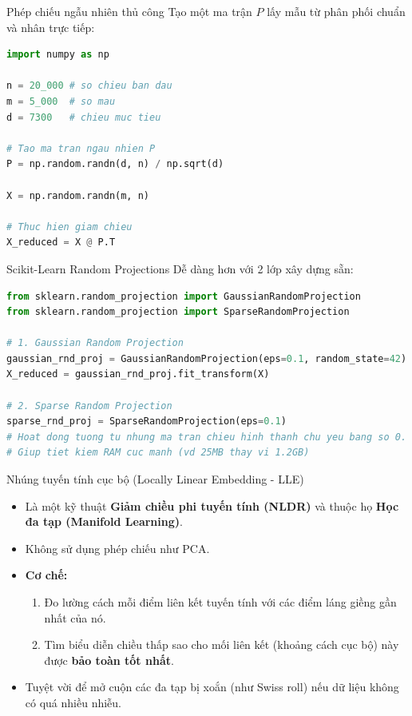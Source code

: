 \documentclass[aspectratio=169]{beamer}
\begin{document}
\begin{frame}[fragile]{Phép chiếu ngẫu nhiên thủ công}
    Tạo một ma trận $P$ lấy mẫu từ phân phối chuẩn và nhân trực tiếp:
    \begin{lstlisting}[language=Python]
import numpy as np

n = 20_000 # so chieu ban dau
m = 5_000  # so mau
d = 7300   # chieu muc tieu

# Tao ma tran ngau nhien P
P = np.random.randn(d, n) / np.sqrt(d)

X = np.random.randn(m, n) 

# Thuc hien giam chieu
X_reduced = X @ P.T 
    \end{lstlisting}
\end{frame}

\begin{frame}[fragile]{Scikit-Learn Random Projections}
    Dễ dàng hơn với 2 lớp xây dựng sẵn:
    \begin{lstlisting}[language=Python]
from sklearn.random_projection import GaussianRandomProjection
from sklearn.random_projection import SparseRandomProjection

# 1. Gaussian Random Projection
gaussian_rnd_proj = GaussianRandomProjection(eps=0.1, random_state=42)
X_reduced = gaussian_rnd_proj.fit_transform(X)

# 2. Sparse Random Projection
sparse_rnd_proj = SparseRandomProjection(eps=0.1)
# Hoat dong tuong tu nhung ma tran chieu hinh thanh chu yeu bang so 0.
# Giup tiet kiem RAM cuc manh (vd 25MB thay vi 1.2GB)
    \end{lstlisting}
\end{frame}

\begin{frame}{Nhúng tuyến tính cục bộ (Locally Linear Embedding - LLE)}
    \begin{itemize}
        \item Là một kỹ thuật \textbf{Giảm chiều phi tuyến tính (NLDR)} và thuộc họ \textbf{Học đa tạp (Manifold Learning)}.
        \item Không sử dụng phép chiếu như PCA. 
        \item \textbf{Cơ chế:} 
        \begin{enumerate}
            \item Đo lường cách mỗi điểm liên kết tuyến tính với các điểm láng giềng gần nhất của nó.
            \item Tìm biểu diễn chiều thấp sao cho mối liên kết (khoảng cách cục bộ) này được \textbf{bảo toàn tốt nhất}.
        \end{enumerate}
        \item Tuyệt vời để mở cuộn các đa tạp bị xoắn (như Swiss roll) nếu dữ liệu không có quá nhiều nhiễu.
    \end{itemize}
\end{frame}
\end{document}
